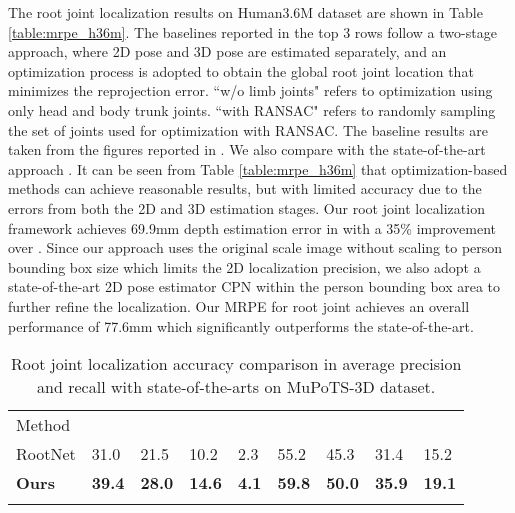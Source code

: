 \documentclass[runningheads]{llncs}
\begin{document}
The root joint localization results on Human3.6M dataset are shown in Table \ref{table:mrpe_h36m}. The baselines reported in the top 3 rows follow a two-stage approach, where 2D pose \cite{sun2018integral} and 3D pose \cite{martinez2017simple} are estimated separately, and an optimization process is adopted to obtain the global root joint location that minimizes the reprojection error. ``w/o limb joints" refers to optimization using only head and body trunk joints. ``with RANSAC" refers to randomly sampling the set of joints used for optimization with RANSAC.
The baseline results are taken from the figures reported in \cite{Moon_2019_ICCV_3DMPPE}.
We also compare with the state-of-the-art approach \cite{Moon_2019_ICCV_3DMPPE}.
It can be seen from Table \ref{table:mrpe_h36m} that optimization-based methods can achieve reasonable results, but with limited accuracy due to the errors from both the 2D and 3D estimation stages.
Our root joint localization framework achieves 69.9mm depth estimation error in  with a 35\% improvement over \cite{Moon_2019_ICCV_3DMPPE}. Since our approach uses the original scale image without scaling to person bounding box size which limits the 2D  localization precision, we also adopt a state-of-the-art 2D pose estimator CPN \cite{chen2018cascaded} within the person bounding box area to further refine the  localization. Our MRPE for root joint achieves an overall performance of 77.6mm which significantly outperforms the state-of-the-art.

\setlength{\tabcolsep}{4pt}
\begin{table}[t]
\begin{center}
\caption{Root joint localization accuracy comparison in average precision and recall with state-of-the-arts on MuPoTS-3D dataset.}
\label{table:ap_mupo}
\begin{tabular}{l|llll|llll}
\hline\noalign{\smallskip}
Method &  &  &  &  &  &  &  & \\
\noalign{\smallskip}
\hline
\noalign{\smallskip}
RootNet \cite{Moon_2019_ICCV_3DMPPE} & 31.0 & 21.5 & 10.2 & 2.3 & 55.2 & 45.3 & 31.4 & 15.2\\
\noalign{\smallskip}
\hline
\noalign{\smallskip}
\textbf{Ours} & \textbf{39.4} & \textbf{28.0} & \textbf{14.6} & \textbf{4.1} & \textbf{59.8} & \textbf{50.0} & \textbf{35.9} & \textbf{19.1}\\
\noalign{\smallskip}
\hline
\end{tabular}
\end{center}
\end{table}
\setlength{\tabcolsep}{1.4pt}
\end{document}
